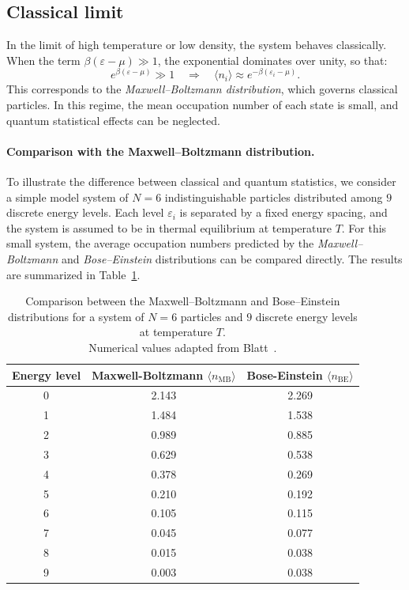 \subsection*{Classical limit}
In the limit of high temperature or low density, the system behaves classically.  
When the term \( \beta(\varepsilon - \mu) \gg 1 \), the exponential dominates over unity, so that:
\[
    e^{\beta(\varepsilon - \mu)} \gg 1 \quad \Rightarrow \quad 
    \langle n_i \rangle \approx e^{-\beta(\varepsilon_i - \mu)}.
\]
This corresponds to the \textit{Maxwell--Boltzmann distribution}, which governs classical particles.  
In this regime, the mean occupation number of each state is small, and quantum statistical effects can be neglected.


\paragraph{Comparison with the Maxwell--Boltzmann distribution.}
To illustrate the difference between classical and quantum statistics, we consider a simple model system of \( N = 6 \) indistinguishable particles distributed among \( 9 \) discrete energy levels.  
Each level \( \varepsilon_i \) is separated by a fixed energy spacing, and the system is assumed to be in thermal equilibrium at temperature \( T \).  
For this small system, the average occupation numbers predicted by the \textit{Maxwell--Boltzmann} and \textit{Bose--Einstein} distributions can be compared directly.  
The results are summarized in Table~\ref{tab:BE_MB_comparison}.  

\begin{table}[H]
    \centering
    \begin{tabular}{ccc}
        \hline
        \textbf{Energy level} & \textbf{Maxwell-Boltzmann} $\langle n_{\mathrm{MB}}\rangle$ & \textbf{Bose-Einstein} $\langle n_{\mathrm{BE}}\rangle$ \\
        \hline
        0 & 2.143 & 2.269 \\
        1 & 1.484 & 1.538 \\
        2 & 0.989 & 0.885 \\
        3 & 0.629 & 0.538 \\
        4 & 0.378 & 0.269 \\
        5 & 0.210 & 0.192 \\
        6 & 0.105 & 0.115 \\
        7 & 0.045 & 0.077 \\
        8 & 0.015 & 0.038 \\
        9 & 0.003 & 0.038 \\
        \hline
    \end{tabular}
    \caption{
    Comparison between the Maxwell--Boltzmann and Bose--Einstein distributions for a system of \( N = 6 \) particles and \( 9 \) discrete energy levels at temperature \( T \). \\Numerical values adapted from Blatt~\cite{blatt1992}.
    }
    \label{tab:BE_MB_comparison}
\end{table}

